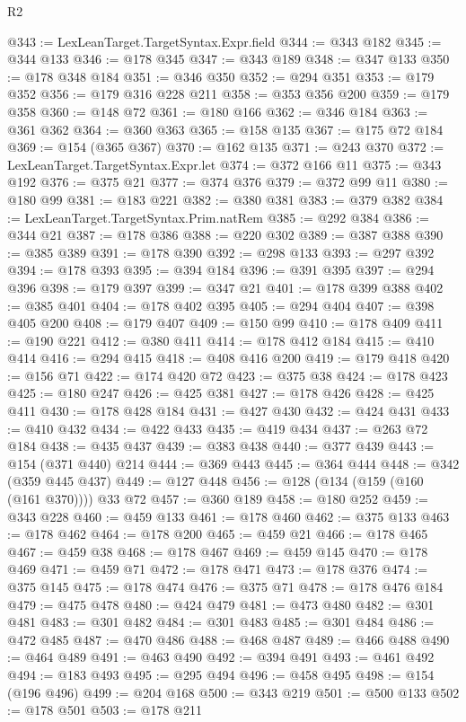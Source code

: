 \begin{lexlean}{R2}
\begin{coremodule}
@343 := LexLeanTarget.TargetSyntax.Expr.field
@344 := @343 @182
@345 := @344 @133
@346 := @178 @345
@347 := @343 @189
@348 := @347 @133
@350 := @178 @348 @184
@351 := @346 @350
@352 := @294 @351
@353 := @179 @352
@356 := @179 @316 @228 @211
@358 := @353 @356 @200
@359 := @179 @358
@360 := @148 @72
@361 := @180 @166
@362 := @346 @184
@363 := @361 @362
@364 := @360 @363
@365 := @158 @135
@367 := @175 @72 @184
@369 := @154 (@365 @367)
@370 := @162 @135
@371 := @243 @370
@372 := LexLeanTarget.TargetSyntax.Expr.let
@374 := @372 @166 @11
@375 := @343 @192
@376 := @375 @21
@377 := @374 @376
@379 := @372 @99 @11
@380 := @180 @99
@381 := @183 @221
@382 := @380 @381
@383 := @379 @382
@384 := LexLeanTarget.TargetSyntax.Prim.natRem
@385 := @292 @384
@386 := @344 @21
@387 := @178 @386
@388 := @220 @302
@389 := @387 @388
@390 := @385 @389
@391 := @178 @390
@392 := @298 @133
@393 := @297 @392
@394 := @178 @393
@395 := @394 @184
@396 := @391 @395
@397 := @294 @396
@398 := @179 @397
@399 := @347 @21
@401 := @178 @399 @388
@402 := @385 @401
@404 := @178 @402 @395
@405 := @294 @404
@407 := @398 @405 @200
@408 := @179 @407
@409 := @150 @99
@410 := @178 @409
@411 := @190 @221
@412 := @380 @411
@414 := @178 @412 @184
@415 := @410 @414
@416 := @294 @415
@418 := @408 @416 @200
@419 := @179 @418
@420 := @156 @71
@422 := @174 @420 @72
@423 := @375 @38
@424 := @178 @423
@425 := @180 @247
@426 := @425 @381
@427 := @178 @426
@428 := @425 @411
@430 := @178 @428 @184
@431 := @427 @430
@432 := @424 @431
@433 := @410 @432
@434 := @422 @433
@435 := @419 @434
@437 := @263 @72 @184
@438 := @435 @437
@439 := @383 @438
@440 := @377 @439
@443 := @154 (@371 @440) @214
@444 := @369 @443
@445 := @364 @444
@448 := @342 (@359 @445 @437)
@449 := @127 @448
@456 := @128 (@134 (@159 (@160 (@161 @370)))) @33 @72
@457 := @360 @189
@458 := @180 @252
@459 := @343 @228
@460 := @459 @133
@461 := @178 @460
@462 := @375 @133
@463 := @178 @462
@464 := @178 @200
@465 := @459 @21
@466 := @178 @465
@467 := @459 @38
@468 := @178 @467
@469 := @459 @145
@470 := @178 @469
@471 := @459 @71
@472 := @178 @471
@473 := @178 @376
@474 := @375 @145
@475 := @178 @474
@476 := @375 @71
@478 := @178 @476 @184
@479 := @475 @478
@480 := @424 @479
@481 := @473 @480
@482 := @301 @481
@483 := @301 @482
@484 := @301 @483
@485 := @301 @484
@486 := @472 @485
@487 := @470 @486
@488 := @468 @487
@489 := @466 @488
@490 := @464 @489
@491 := @463 @490
@492 := @394 @491
@493 := @461 @492
@494 := @183 @493
@495 := @295 @494
@496 := @458 @495
@498 := @154 (@196 @496)
@499 := @204 @168
@500 := @343 @219
@501 := @500 @133
@502 := @178 @501
@503 := @178 @211

\end{coremodule}
\end{lexlean}
